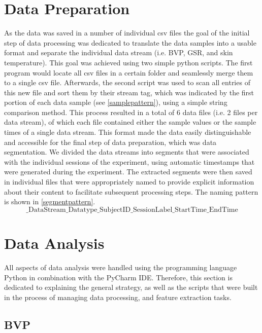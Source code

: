 \section{Data Preparation}
As the data was saved in a number of individual csv files the goal of the initial step of data processing was dedicated to translate the data samples into a usable format and separate the individual data stream (i.e. BVP, GSR, and skin temperature). This goal was achieved using two simple python scripts. The first program would locate all csv files in a certain folder and seamlessly merge them to a single csv file. Afterwards, the second script was used to scan all entries of this new file and sort them by their stream tag, which was indicated by the first portion of each data sample (see \ref{samplepattern}), using a simple string comparison method. This process resulted in a total of 6 data files (i.e. 2 files per data stream), of which each file contained either the sample values or the sample times of a single data stream. This format made the data easily distinguishable and accessible for the final step of data preparation, which was data segmentation. We divided the data streams into segments that were associated with the individual sessions of the experiment, using automatic timestamps that were generated during the experiment. The extracted segments were then saved in individual files that were appropriately named to provide explicit information about their content to facilitate subsequent processing steps. The naming pattern is shown in \ref{segmentpattern}.
\begin{equation}\label{segmentpattern}
\text{\_DataStream\_Datatype\_SubjectID\_SessionLabel\_StartTime\_EndTime}
\end{equation}

\section{Data Analysis}
All aspects of data analysis were handled using the programming language Python in combination with the PyCharm IDE. Therefore, this section is dedicated to explaining the general strategy, as well as the scripts that were built in the process of managing data processing, and feature extraction tasks.

\subsection{BVP}
